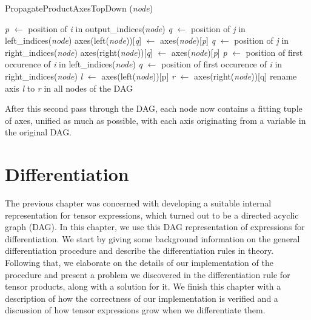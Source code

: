 \documentclass[12pt, a4paper]{report} %
\begin{document}
\begin{algorithm}[ht!]
    \caption[Top-Down Axis Propagation in Product Node]{PropagateProductAxesTopDown (\textit{node})}
    \label{alg:product_axes_2}
    \begin{algorithmic}
            \State \textit{p} $\gets$ position of \textit{i} in output\_indices(\textit{node})
                \State \textit{q} $\gets$ position of \textit{j} in left\_indices(\textit{node})
                    \State axes(left(\textit{node}))[\textit{q}] $\gets$ axes(\textit{node})[\textit{p}]
                \EndIf
            \EndFor
                \State \textit{q} $\gets$ position of \textit{j} in right\_indices(\textit{node})
                    \State axes(right(\textit{node}))[\textit{q}] $\gets$ axes(\textit{node})[\textit{p}]
                \EndIf
            \EndFor
        \EndFor
         
            \State \textit{p} $\gets$ position of first occurence of \textit{i} in left\_indices(\textit{node})
                \State \textit{q} $\gets$ position of first occurence of \textit{i} in right\_indices(\textit{node})
                \State \textit{l} $\gets$ axes(left(\textit{node}))[p]
                \State \textit{r} $\gets$ axes(right(\textit{node}))[q]
                \State rename axis \textit{l} to \textit{r} in all nodes of the DAG
            \EndIf
        \EndFor
    \end{algorithmic}
\end{algorithm}

After this second pass through the DAG, each node now contains a fitting tuple of axes, unified as much as possible, with each axis originating from a variable in the original DAG.

\FloatBarrier
\chapter{Differentiation}
The previous chapter was concerned with developing a suitable internal representation for tensor expressions, which turned out to be a directed acyclic graph (DAG).
In this chapter, we use this DAG representation of expressions for differentiation.
We start by giving some background information on the general differentiation procedure and describe the differentiation rules in theory.
Following that, we elaborate on the details of our implementation of the procedure and present a problem we discovered in the differentiation rule for tensor products, along with a solution for it.
We finish this chapter with a description of how the correctness of our implementation is verified and a discussion of how tensor expressions grow when we differentiate them.
\end{document}
